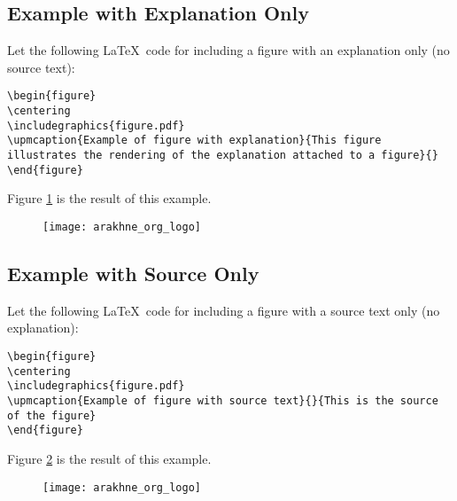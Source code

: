 \documentclass[book,taskpackage,specpackage,codepackage]{upmethodology-document}
\begin{document}
\subsection{Example with Explanation Only}

Let the following \LaTeX\ code for including a figure with an explanation only (no source text):

\texttt{{\textbackslash}begin\{figure\}} \\
\texttt{{\textbackslash}centering} \\
\texttt{{\textbackslash}includegraphics\{figure.pdf\}} \\
\texttt{{\textbackslash}upmcaption\{Example of figure with explanation\}\{This figure illustrates the rendering of the explanation attached to a figure\}\{\}} \\
\texttt{{\textbackslash}end\{figure\}}

Figure \ref{example:upmcaption1} is the result of this example.

\begin{figure}
	\centering
	\texttt{[image: arakhne\_org\_logo]}
	\label{example:upmcaption1}
\end{figure}

\subsection{Example with Source Only}

Let the following \LaTeX\ code for including a figure with a source text only (no explanation):

\texttt{{\textbackslash}begin\{figure\}} \\
\texttt{{\textbackslash}centering} \\
\texttt{{\textbackslash}includegraphics\{figure.pdf\}} \\
\texttt{{\textbackslash}upmcaption\{Example of figure with source text\}\{\}\{This is the source of the figure\}} \\
\texttt{{\textbackslash}end\{figure\}}

Figure \ref{example:upmcaption2} is the result of this example.

\begin{figure}
	\centering
	\texttt{[image: arakhne\_org\_logo]}
	\label{example:upmcaption2}
\end{figure}
\end{document}
